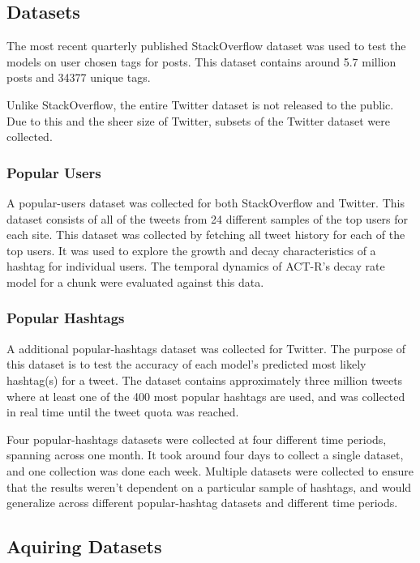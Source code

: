 \documentclass[man,floatsintext,donotrepeattitle]{apa6}
\begin{document}

\subsection{Datasets}

The most recent quarterly published StackOverflow dataset \parencite{DataDump2013} was used to test the models on user chosen tags for posts.
This dataset contains around \num{5.7} million posts and \num{34377} unique tags.

Unlike StackOverflow, the entire Twitter dataset is not released to the public.
Due to this and the sheer size of Twitter, subsets of the Twitter dataset were collected.

\subsubsection{Popular Users}

A popular-users dataset was collected for both StackOverflow and Twitter.
This dataset consists of all of the tweets from 24 different samples of the top users for each site.
This dataset was collected by fetching all tweet history for each of the top users.
It was used to explore the growth and decay characteristics of a hashtag for individual users.
The temporal dynamics of ACT-R's decay rate model for a chunk were evaluated against this data.

\subsubsection{Popular Hashtags}

A additional popular-hashtags dataset was collected for Twitter.
The purpose of this dataset is to test the accuracy of each model's predicted most likely hashtag(s) for a tweet.
The dataset contains approximately three million tweets where at least one of the 400 most popular hashtags are used, and was collected in real time until the tweet quota was reached.

Four popular-hashtags datasets were collected at four different time periods, spanning across one month.
It took around four days to collect a single dataset, and one collection was done each week.
Multiple datasets were collected to ensure that the results weren't dependent on a particular sample of hashtags, and would generalize across different popular-hashtag datasets and different time periods.

\subsection{Aquiring Datasets}
\end{document}
